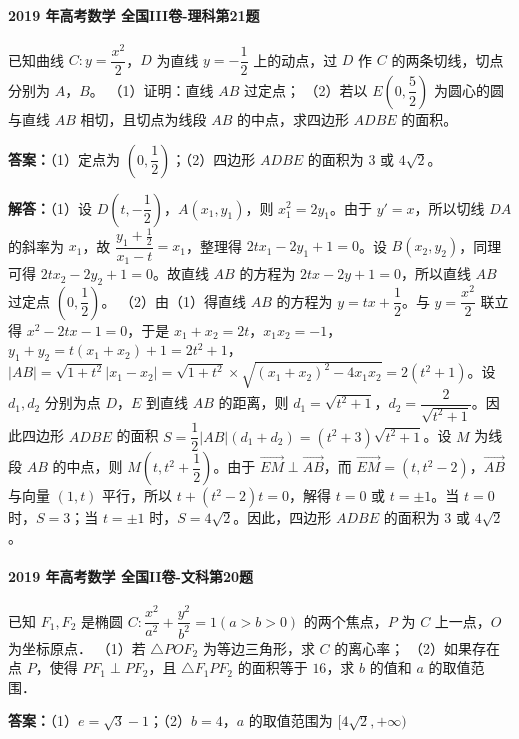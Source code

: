 \documentclass[UTF8,a4paper,11pt]{ctexart}
\begin{document}
\paragraph{2019 年高考数学 全国III卷-理科第21题}

已知曲线 $C: y=\dfrac{x^2}{2}$，$D$ 为直线 $y=-\dfrac{1}{2}$ 上的动点，过 $D$ 作 $C$ 的两条切线，切点分别为 $A$，$B$。
（1）证明：直线 $AB$ 过定点；
（2）若以 $E\left(0,\dfrac{5}{2}\right)$ 为圆心的圆与直线 $AB$ 相切，且切点为线段 $AB$ 的中点，求四边形 $ADBE$ 的面积。

\textbf{答案：}（1）定点为 $\left(0,\dfrac{1}{2}\right)$；（2）四边形 $ADBE$ 的面积为 $3$ 或 $4\sqrt{2}$。\par

\textbf{解答：}（1）设 $D\left(t,-\dfrac{1}{2}\right)$，$A(x_1,y_1)$，则 $x_1^2=2y_1$。由于 $y'=x$，所以切线 $DA$ 的斜率为 $x_1$，故 $\dfrac{y_1+\frac{1}{2}}{x_1-t}=x_1$，整理得 $2tx_1-2y_1+1=0$。设 $B(x_2,y_2)$，同理可得 $2tx_2-2y_2+1=0$。故直线 $AB$ 的方程为 $2tx-2y+1=0$，所以直线 $AB$ 过定点 $\left(0,\dfrac{1}{2}\right)$。
（2）由（1）得直线 $AB$ 的方程为 $y=tx+\dfrac{1}{2}$。与 $y=\dfrac{x^2}{2}$ 联立得 $x^2-2tx-1=0$，于是 $x_1+x_2=2t$，$x_1x_2=-1$，$y_1+y_2=t(x_1+x_2)+1=2t^2+1$，$|AB|=\sqrt{1+t^2}|x_1-x_2|=\sqrt{1+t^2}\times\sqrt{(x_1+x_2)^2-4x_1x_2}=2(t^2+1)$。设 $d_1,d_2$ 分别为点 $D$，$E$ 到直线 $AB$ 的距离，则 $d_1=\sqrt{t^2+1}$，$d_2=\dfrac{2}{\sqrt{t^2+1}}$。因此四边形 $ADBE$ 的面积 $S=\dfrac{1}{2}|AB|(d_1+d_2)=(t^2+3)\sqrt{t^2+1}$。设 $M$ 为线段 $AB$ 的中点，则 $M\left(t,t^2+\dfrac{1}{2}\right)$。由于 $\overrightarrow{EM}\perp\overrightarrow{AB}$，而 $\overrightarrow{EM}=(t,t^2-2)$，$\overrightarrow{AB}$ 与向量 $(1,t)$ 平行，所以 $t+(t^2-2)t=0$，解得 $t=0$ 或 $t=\pm1$。当 $t=0$ 时，$S=3$；当 $t=\pm1$ 时，$S=4\sqrt{2}$。因此，四边形 $ADBE$ 的面积为 $3$ 或 $4\sqrt{2}$。

\paragraph{2019 年高考数学 全国II卷-文科第20题}

已知 $F_1,F_2$ 是椭圆 $C:\dfrac{x^2}{a^2}+\dfrac{y^2}{b^2}=1(a>b>0)$ 的两个焦点，$P$ 为 $C$ 上一点，$O$ 为坐标原点．
（1）若 $\triangle POF_2$ 为等边三角形，求 $C$ 的离心率；
（2）如果存在点 $P$，使得 $PF_1\perp PF_2$，且 $\triangle F_1PF_2$ 的面积等于 $16$，求 $b$ 的值和 $a$ 的取值范围．

\textbf{答案：}（1）$e=\sqrt{3}-1$；（2）$b=4$，$a$ 的取值范围为 $[4\sqrt{2},+\infty)$\par
\end{document}

